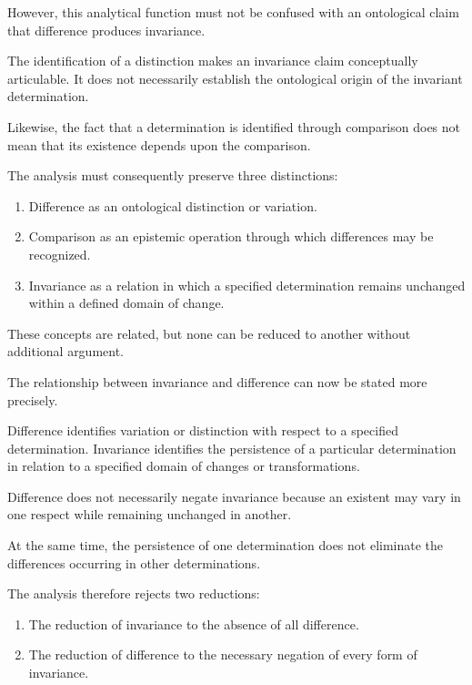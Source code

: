 However, this analytical function must
not be confused with an ontological claim
that difference produces invariance.

The identification of a distinction makes
an invariance claim conceptually articulable.
It does not necessarily establish the
ontological origin of the invariant
determination.

Likewise, the fact that a determination
is identified through comparison does
not mean that its existence depends upon
the comparison.

The analysis must consequently preserve
three distinctions:

\begin{enumerate}
    \item Difference as an ontological
    distinction or variation.

    \item Comparison as an epistemic
    operation through which differences
    may be recognized.

    \item Invariance as a relation in which
    a specified determination remains
    unchanged within a defined domain
    of change.
\end{enumerate}

These concepts are related, but none
can be reduced to another without
additional argument.


The relationship between invariance and
difference can now be stated more precisely.

Difference identifies variation or
distinction with respect to a specified
determination. Invariance identifies
the persistence of a particular
determination in relation to a specified
domain of changes or transformations.

Difference does not necessarily negate
invariance because an existent may vary
in one respect while remaining unchanged
in another.

At the same time, the persistence of
one determination does not eliminate
the differences occurring in other
determinations.

The analysis therefore rejects two
reductions:

\begin{enumerate}
    \item The reduction of invariance
    to the absence of all difference.

    \item The reduction of difference
    to the necessary negation of
    every form of invariance.
\end{enumerate}

